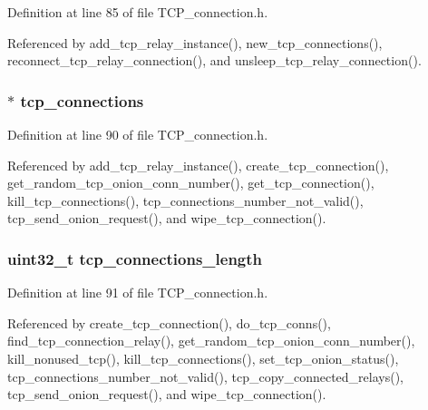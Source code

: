 Definition at line 85 of file T\+C\+P\+\_\+connection.\+h.



Referenced by add\+\_\+tcp\+\_\+relay\+\_\+instance(), new\+\_\+tcp\+\_\+connections(), reconnect\+\_\+tcp\+\_\+relay\+\_\+connection(), and unsleep\+\_\+tcp\+\_\+relay\+\_\+connection().

\hypertarget{struct_t_c_p___connections_a600688b27d874e40eab4680fb90fa58a}{
\subsubsection[{tcp\+\_\+connections}]{$\ast$ tcp\+\_\+connections}}\label{struct_t_c_p___connections_a600688b27d874e40eab4680fb90fa58a}


Definition at line 90 of file T\+C\+P\+\_\+connection.\+h.



Referenced by add\+\_\+tcp\+\_\+relay\+\_\+instance(), create\+\_\+tcp\+\_\+connection(), get\+\_\+random\+\_\+tcp\+\_\+onion\+\_\+conn\+\_\+number(), get\+\_\+tcp\+\_\+connection(), kill\+\_\+tcp\+\_\+connections(), tcp\+\_\+connections\+\_\+number\+\_\+not\+\_\+valid(), tcp\+\_\+send\+\_\+onion\+\_\+request(), and wipe\+\_\+tcp\+\_\+connection().

\hypertarget{struct_t_c_p___connections_aa1780d3567bf0105a493ce227133f810}{
\subsubsection[{tcp\+\_\+connections\+\_\+length}]{\setlength{\rightskip}{0pt plus 5cm}uint32\+\_\+t tcp\+\_\+connections\+\_\+length}}\label{struct_t_c_p___connections_aa1780d3567bf0105a493ce227133f810}


Definition at line 91 of file T\+C\+P\+\_\+connection.\+h.



Referenced by create\+\_\+tcp\+\_\+connection(), do\+\_\+tcp\+\_\+conns(), find\+\_\+tcp\+\_\+connection\+\_\+relay(), get\+\_\+random\+\_\+tcp\+\_\+onion\+\_\+conn\+\_\+number(), kill\+\_\+nonused\+\_\+tcp(), kill\+\_\+tcp\+\_\+connections(), set\+\_\+tcp\+\_\+onion\+\_\+status(), tcp\+\_\+connections\+\_\+number\+\_\+not\+\_\+valid(), tcp\+\_\+copy\+\_\+connected\+\_\+relays(), tcp\+\_\+send\+\_\+onion\+\_\+request(), and wipe\+\_\+tcp\+\_\+connection().

